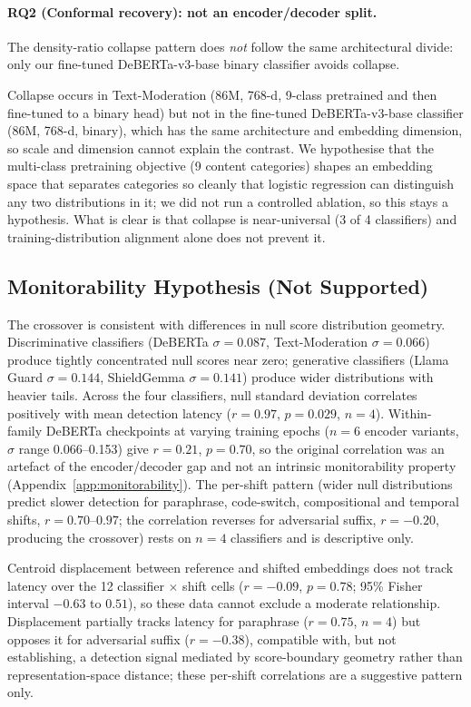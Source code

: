 \documentclass{article}
\begin{document}
\paragraph{RQ2 (Conformal recovery): not an encoder/decoder split.} The density-ratio collapse pattern does \emph{not} follow the same architectural divide: only our fine-tuned DeBERTa-v3-base binary classifier avoids collapse.

Collapse occurs in Text-Moderation (86M, 768-d, 9-class pretrained and then fine-tuned to a binary head) but not in the fine-tuned DeBERTa-v3-base classifier (86M, 768-d, binary), which has the same architecture and embedding dimension, so scale and dimension cannot explain the contrast. We hypothesise that the multi-class pretraining objective (9 content categories) shapes an embedding space that separates categories so cleanly that logistic regression can distinguish any two distributions in it; we did not run a controlled ablation, so this stays a hypothesis. What is clear is that collapse is near-universal (3 of 4 classifiers) and training-distribution alignment alone does not prevent it.

\subsection{Monitorability Hypothesis (Not Supported)}
\label{sec:mechanistic}

The crossover is consistent with differences in null score distribution geometry. Discriminative classifiers (DeBERTa $\sigma{=}0.087$, Text-Moderation $\sigma{=}0.066$) produce tightly concentrated null scores near zero; generative classifiers (Llama Guard $\sigma{=}0.144$, ShieldGemma $\sigma{=}0.141$) produce wider distributions with heavier tails. Across the four classifiers, null standard deviation correlates positively with mean detection latency ($r{=}0.97$, $p{=}0.029$, $n{=}4$). Within-family DeBERTa checkpoints at varying training epochs ($n = 6$ encoder variants, $\sigma$ range 0.066--0.153) give $r = 0.21$, $p = 0.70$, so the original correlation was an artefact of the encoder/decoder gap and not an intrinsic monitorability property (Appendix~\ref{app:monitorability}). The per-shift pattern (wider null distributions predict slower detection for paraphrase, code-switch, compositional and temporal shifts, $r = 0.70$--$0.97$; the correlation reverses for adversarial suffix, $r{=}{-}0.20$, producing the crossover) rests on $n{=}4$ classifiers and is descriptive only.

Centroid displacement between reference and shifted embeddings does not track latency over the 12 classifier $\times$ shift cells ($r{=}{-}0.09$, $p{=}0.78$; 95\% Fisher interval $-0.63$ to $0.51$), so these data cannot exclude a moderate relationship. Displacement partially tracks latency for paraphrase ($r{=}0.75$, $n{=}4$) but opposes it for adversarial suffix ($r{=}{-}0.38$), compatible with, but not establishing, a detection signal mediated by score-boundary geometry rather than representation-space distance; these per-shift correlations are a suggestive pattern only.
\end{document}

